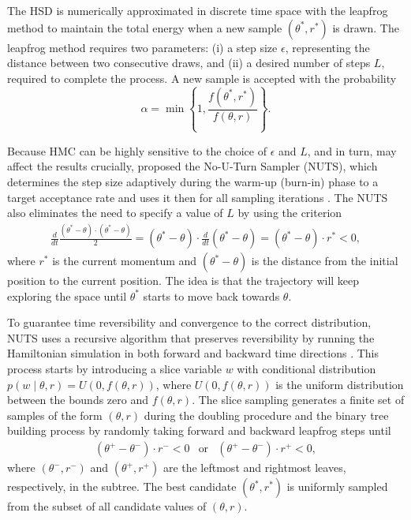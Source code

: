 \documentclass[a4paper]{article}   	%
\begin{document}
	The HSD is numerically approximated in discrete time space with the leapfrog method to maintain the total energy when a new sample $(\theta^*,r^*)$ is drawn. The leapfrog method requires two parameters: (i) a step size $\epsilon$, representing the distance between two consecutive draws, and (ii) a desired number of steps $L$, required to complete the process. A new sample is accepted with the probability 
	\begin{equation}
		\alpha = \min \left\{ 1, \frac{f(\theta^*,r^*)}{ f(\theta,r)} \right\}. 
	\end{equation}
	
	Because HMC can be highly sensitive to the choice of $\epsilon$ and $L$, and in turn, may affect the results crucially, \textcite{Hoffman2014NoUturn} proposed the No-U-Turn Sampler (NUTS), which determines the step size adaptively during the warm-up (burn-in) phase to a target acceptance rate and uses it then for all sampling iterations \parencite{Monnahan2017Faster}. The NUTS also eliminates the need to specify a value of $L$ by using the criterion 
	\begin{eqnarray}
		\frac{d}{dt}\frac{(\theta^*-\theta)\cdot(\theta^*-\theta)}{2}=(\theta^*-\theta)\cdot\frac{d}{dt}(\theta^*-\theta)=(\theta^*-\theta)\cdot r^* <0,
	\end{eqnarray}
	where $r^*$ is the current momentum and $(\theta^*-\theta)$ is the distance from the initial position to the current position. The idea is that the trajectory will keep exploring the space until $\theta^*$ starts to move back towards $\theta$. 
	
	
	To guarantee time reversibility and convergence to the correct distribution, NUTS uses a recursive algorithm that preserves reversibility by running the Hamiltonian simulation in both forward and backward time directions \parencite{Hoffman2014NoUturn}. This process starts by introducing a slice variable $w$ with conditional distribution $p(w\mid\theta, r) = U(0,f(\theta,r) )$, where $U(0,f(\theta,r))$ is the uniform distribution between the bounds zero and $f(\theta,r)$. The slice sampling generates a finite set of samples of the form $(\theta,r)$ during the doubling procedure and the binary tree building process by randomly taking forward and backward leapfrog steps until 
	\begin{equation}
		\begin{matrix}
			(\theta^+-\theta^-)\cdot r^- <0 & \mbox{or} & (\theta^+-\theta^-)\cdot r^+ <0,
		\end{matrix}
	\end{equation}
	where $(\theta^-, r^-)$ and $(\theta^+, r^+)$ are the leftmost and rightmost leaves, respectively, in the subtree. The best candidate $(\theta^*,r^*)$ is uniformly sampled from the subset of all candidate values of $(\theta,r)$. 
	
\end{document}
